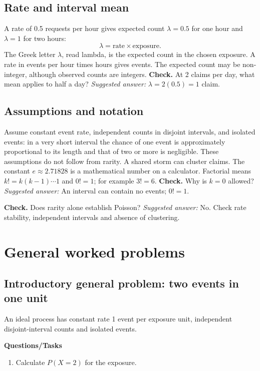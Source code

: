 \subsection{Rate and interval mean}
A rate of 0.5 requests per hour gives expected count $\lambda=0.5$ for one hour and $\lambda=1$ for two hours:
\[\lambda=\text{rate}\times\text{exposure}.\]
The Greek letter $\lambda$, read lambda, is the expected count in the chosen exposure. A rate in events per hour times hours gives events. The expected count may be non-integer, although observed counts are integers.
\textbf{Check.} At 2 claims per day, what mean applies to half a day? \emph{Suggested answer:} $\lambda=2(0.5)=1$ claim.


\subsection{Assumptions and notation}
Assume constant event rate, independent counts in disjoint intervals, and isolated events: in a very short interval the chance of one event is approximately proportional to its length and that of two or more is negligible. These assumptions do not follow from rarity. A shared storm can cluster claims. The constant $e\approx2.71828$ is a mathematical number on a calculator. Factorial means $k!=k(k-1)\cdots1$ and $0!=1$; for example $3!=6$.
\textbf{Check.} Why is $k=0$ allowed? \emph{Suggested answer:} An interval can contain no events; $0!=1$.

\textbf{Check.} Does rarity alone establish Poisson? \emph{Suggested answer:} No. Check rate stability, independent intervals and absence of clustering.

\section{General worked problems}
\subsection{Introductory general problem: two events in one unit}
An ideal process has constant rate 1 event per exposure unit, independent disjoint-interval counts and isolated events.

\textbf{Questions/Tasks}
\begin{enumerate}
\item Calculate $P(X=2)$ for the exposure. 
\end{enumerate}
